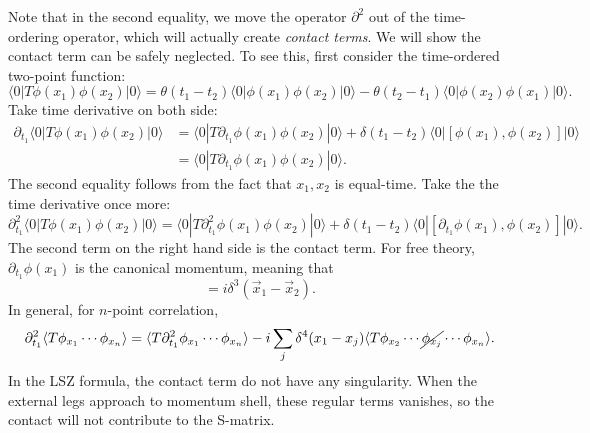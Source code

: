 \documentclass[aps,prb,superscriptaddress,nofootinbib]{revtex4}
\begin{document}
Note that in the second equality, we move the operator $\partial^2$ out of the time-ordering operator, which will actually create \textit{contact terms}.
We will show the contact term can be safely neglected.
To see this, first consider the time-ordered two-point function:
\begin{equation}
	\langle 0|T\phi(x_1)\phi(x_2)|0\rangle
	= \theta(t_1-t_2)\langle 0|\phi(x_1)\phi(x_2)|0\rangle -
	\theta(t_2-t_1)\langle 0|\phi(x_2)\phi(x_1)|0\rangle.
\end{equation}	
Take time derivative on both side:
\begin{equation*}
\begin{aligned}
	\partial_{t_1} \langle 0|T\phi(x_1)\phi(x_2)|0\rangle
	&= \langle 0|T\partial_{t_1}\phi(x_1)\phi(x_2)|0\rangle +
	\delta(t_1-t_2)\langle 0|[\phi(x_1),\phi(x_2)]|0\rangle \\
	&= \langle 0|T\partial_{t_1}\phi(x_1)\phi(x_2)|0\rangle.
\end{aligned}
\end{equation*}
The second equality follows from the fact that $x_1,x_2$ is equal-time.
Take the the time derivative once more:
\begin{equation*}
	\partial^2_{t_1} \langle 0|T\phi(x_1)\phi(x_2)|0\rangle
	= \langle 0|T\partial^2_{t_1}\phi(x_1)\phi(x_2)|0\rangle +
	\delta(t_1-t_2)\langle 0|[\partial_{t_1}\phi(x_1),\phi(x_2)]|0\rangle.
\end{equation*}
The second term on the right hand side is the contact term.
For free theory, $\partial_{t_1}\phi(x_1)$ is the canonical momentum, meaning that
\begin{equation}
	[\phi(\vec x_1, t),\partial_{t}\phi(\vec x_1,t)] = i \delta^{3}(\vec x_1-\vec x_2).
\end{equation}
In general, for $n$-point correlation,
\begin{equation}
\begin{aligned}
	 \partial_{t_1}^2 \langle T\phi_{x_1}\cdots\phi_{x_n} \rangle
	= \langle T\partial_{t_1}^2\phi_{x_1}\cdots\phi_{x_n}\rangle -i \sum_j \delta^4(x_1-x_j) \langle T \phi_{x_2}\cdots\cancel{\phi_{x_j}}\cdots\phi_{x_n} \rangle.
\end{aligned}
\end{equation}
In the LSZ formula, the contact term do not have any singularity.
When the external legs approach to momentum shell, these regular terms vanishes, so the contact will not contribute to the S-matrix.
\end{document}
